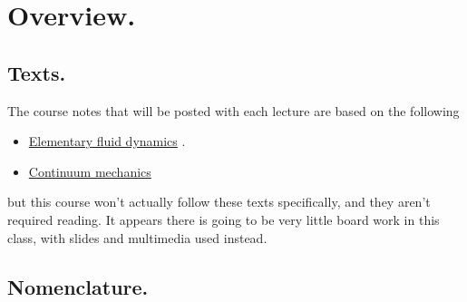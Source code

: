 %
%

\chapter{Overview.}
\label{chap:continuumL1}
{}
\date{Jan 11, 2012}

\beginArtWithToc

\section{Texts.}

The course notes that will be posted with each lecture are based on the following

\begin{itemize}
\item \href{http://www.amazon.com/Elementary-Dynamics-Applied-Mathematics-Computing/dp/0198596790/ref=sr_1_1?ie=UTF8&qid=1326302753&sr=8-1}{Elementary fluid dynamics} \cite{acheson1990elementary}.
\item \href{http://www.amazon.com/Theory-Elasticity-Third-Theoretical-Physics/dp/075062633X/ref=sr_1_6?s=books&ie=UTF8&qid=1326302957&sr=1-6}{Continuum mechanics} \cite{landau1960theory}
\end{itemize}


but this course won't actually follow these texts specifically, and they aren't required reading.  It appears there is going to be very little board work in this class, with slides and multimedia used instead.

\section{Nomenclature.}

